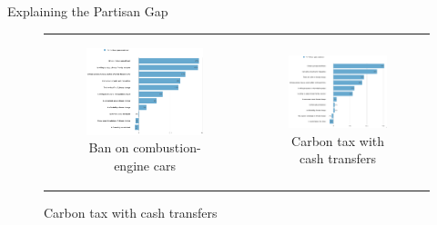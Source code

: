 \begin{frame}{Explaining the Partisan Gap}
\begin{figure}[h!]
	\caption{Gelbach decomposition of the partisan gap in support for:}
	\setlength\extrarowheight{-1pt}
\begin{center}
	\begin{tabular}{cc}
		\begin{subfigure}{0.48\textwidth}
		\caption{Ban on combustion-engine cars}
			\includegraphics[width=\textwidth]{../../figures/Gelbach/gelbach_right_standard_D2SD}
		\end{subfigure}&
		\begin{subfigure}{0.48\textwidth}
		\caption{Carbon tax with cash transfers}
			\includegraphics[width=\textwidth]{../../figures/Gelbach/gelbach_right_tax_transfers_D2SD}
		\end{subfigure}\\
	\end{tabular}
\end{center}
\end{figure}
\end{frame}

